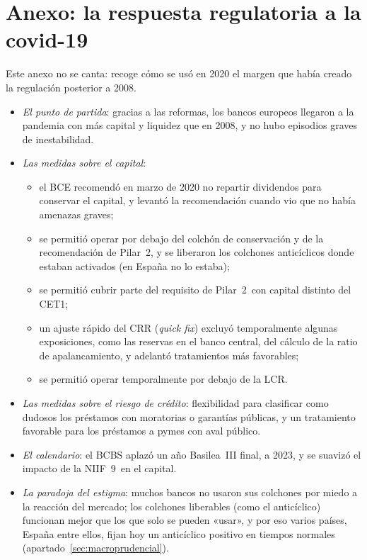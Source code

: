 \documentclass[11pt]{article}
\begin{document}
\section{Anexo: la respuesta regulatoria a la covid-19}\label{anexo:covid}

Este anexo no se canta: recoge cómo se usó en 2020 el margen que había creado la regulación posterior a 2008.

\begin{itemize}
\item \emph{El punto de partida}: gracias a las reformas, los bancos europeos llegaron a la pandemia con más capital y liquidez que en 2008, y no hubo episodios graves de inestabilidad.
\item \emph{Las medidas sobre el capital}:
  \begin{itemize}
  \item el BCE recomendó en marzo de 2020 no repartir dividendos para conservar el capital, y levantó la recomendación cuando vio que no había amenazas graves\nocite{BCE2020Dividendos};
  \item se permitió operar por debajo del colchón de conservación y de la recomendación de Pilar~2, y se liberaron los colchones anticíclicos donde estaban activados (en España no lo estaba);
  \item se permitió cubrir parte del requisito de Pilar~2~con capital distinto del CET1;
  \item un ajuste rápido del CRR (\emph{quick fix}) excluyó temporalmente algunas exposiciones, como las reservas en el banco central, del cálculo de la ratio de apalancamiento, y adelantó tratamientos más favorables;
  \item se permitió operar temporalmente por debajo de la LCR.
  \end{itemize}
\item \emph{Las medidas sobre el riesgo de crédito}: flexibilidad para clasificar como dudosos los préstamos con moratorias o garantías públicas, y un tratamiento favorable para los préstamos a pymes con aval público.
\item \emph{El calendario}: el BCBS aplazó un año Basilea~III final, a 2023, y se suavizó el impacto de la NIIF~9~en el capital\nocite{BCBS2020Aplazamiento}.
\item \emph{La paradoja del estigma}: muchos bancos no usaron sus colchones por miedo a la reacción del mercado; los colchones liberables (como el anticíclico) funcionan mejor que los que solo se pueden «usar», y por eso varios países, España entre ellos, fijan hoy un anticíclico positivo en tiempos normales (apartado~\ref{sec:macroprudencial}).
\end{itemize}
\end{document}
